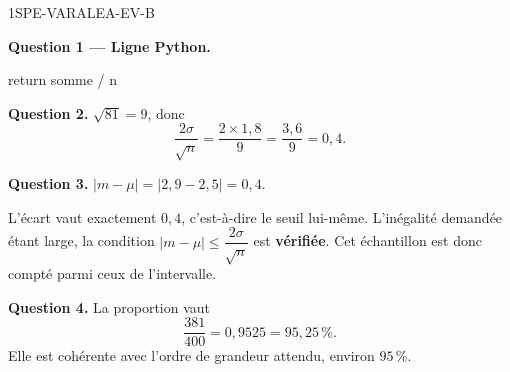 \begin{corrige}{1SPE-VARALEA-EV-B}

\bigskip
\textbf{Question 1 — Ligne Python.}


\begin{python}
    return somme / n
\end{python}

\medskip
\textbf{Question 2.} $\sqrt{81} = 9$, donc
\[
\frac{2\sigma}{\sqrt{n}} = \frac{2 \times 1{,}8}{9} = \frac{3{,}6}{9} = 0{,}4.
\]

\medskip
\textbf{Question 3.} $|m - \mu| = |2{,}9 - 2{,}5| = 0{,}4$.


L'écart vaut exactement $0{,}4$, c'est-à-dire le seuil lui-même. L'inégalité
demandée étant large, la condition $|m - \mu| \leq \dfrac{2\sigma}{\sqrt{n}}$
est \textbf{vérifiée}. Cet échantillon est donc compté parmi ceux de
l'intervalle.

\medskip
\textbf{Question 4.} La proportion vaut
\[
\frac{381}{400} = 0{,}9525 = 95{,}25\,\%.
\]
Elle est cohérente avec l'ordre de grandeur attendu, environ $95\,\%$.

\end{corrige}

